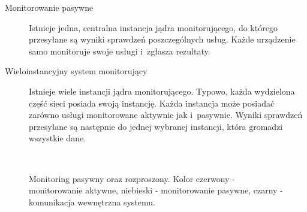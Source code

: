 \begin{description}
\item[Monitorowanie pasywne] Istnieje jedna, centralna instancja jądra
  monitorującego, do którego przesyłane są wyniki sprawdzeń
  poszczególnych usług. Każde urządzenie samo monitoruje swoje usługi
  i~zgłasza rezultaty.
\item[Wieloinstancyjny system monitorujący] Istnieje wiele instancji
  jądra monitorującego. Typowo, każda wydzielona część sieci posiada
  swoją instancję. Każda instancja może posiadać zarówno usługi
  monitorowane aktywnie jak i~pasywnie. Wyniki sprawdzeń przesyłane są
  następnie do jednej wybranej instancji, która gromadzi wszystkie
  dane.
\end{description}

\begin{figure}[ht]
  \caption{Monitoring pasywny oraz rozproszony. Kolor czerwony -
    monitorowanie aktywne, niebieski - monitorowanie pasywne, czarny -
    komunikacja wewnętrzna systemu.}
  \label{fig:PorPasIRozp}
\\[0.1cm]
\end{figure}

